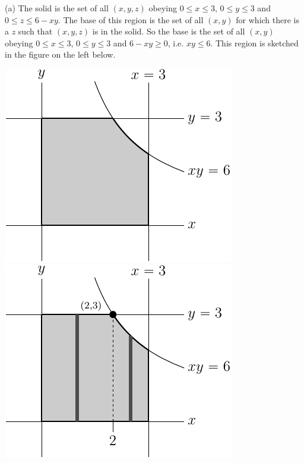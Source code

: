 \begin{solution}
(a) The solid is the set of all $(x,y,z)$ obeying
$0\le x\le 3$, $0\le y\le 3$ and $0\le z\le 6-xy$. The base of this region
is the set of all $(x,y)$ for which there is a $z$ such that $(x,y,z)$
is in the solid. So the base is the set of all $(x,y)$ obeying
$0\le x\le 3$, $0\le y\le 3$ and $6-xy\ge 0$, i.e. $xy\le 6$. 
This region is sketched in the figure on the left below.

\begin{center}
     \includegraphics{fig/OE03DQ6a.pdf} \qquad
     \includegraphics{fig/OE03DQ6.pdf} 
\end{center}


\end{solution}
